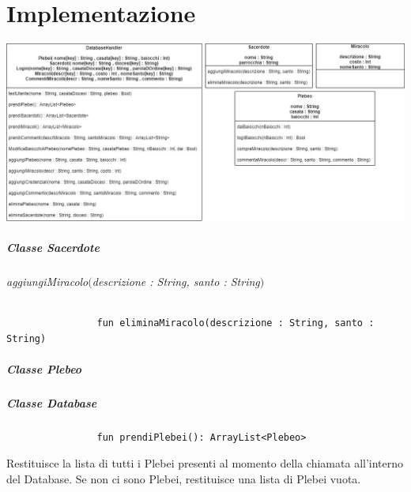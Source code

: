 \documentclass[a4paper]{report}
\begin{document}
    \chapter*{Implementazione}

            \includegraphics[scale = 0.5]{diagrammaER.jpg}

            \paragraph*{Classe Sacerdote}

                \subparagraph*{aggiungiMiracolo$($descrizione : String, santo : String$)$}
                
                \begin{verbatim}
                fun eliminaMiracolo(descrizione : String, santo : String)
                \end{verbatim}

            \paragraph*{Classe Plebeo}

                

            \paragraph*{Classe Database}

                \begin{verbatim}
                fun prendiPlebei(): ArrayList<Plebeo>
                \end{verbatim}
                Restituisce la lista di tutti i Plebei presenti al momento della chiamata all'interno del Database.
                Se non ci sono Plebei, restituisce una lista di Plebei vuota.

                \vspace*{1cm}
\end{document}
